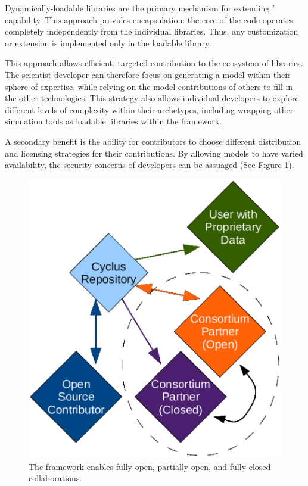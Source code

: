 Dynamically-loadable libraries are the primary mechanism for extending \Cyclus' capability. 
This approach provides encapsulation: the core of the code operates
completely independently from the individual libraries. Thus, any
customization or extension is implemented only in the loadable
library. 

This approach allows efficient, targeted contribution to the ecosystem of libraries.  The 
scientist-developer can therefore focus on generating a model within their 
sphere of expertise, while relying on the model contributions of others to fill 
in the other technologies.  This strategy also allows individual developers to
explore different levels of complexity within their archetypes, including
wrapping other simulation tools as loadable libraries within the \Cyclus
framework.

A secondary benefit is the ability for
contributors to choose different distribution and licensing strategies
for their contributions. By allowing models to have varied
availability, the security concerns of developers can be
assuaged (See Figure \ref{fig:modifiedopen}).

\begin{figure}[htbp!]
\begin{center}
\includegraphics{./images/modifiedopen.eps}
\end{center}
\caption{The \Cyclus framework enables fully open, partially open, and fully
closed collaborations\cite{wilson_cyclus:_2012}.}
\label{fig:modifiedopen}
\end{figure}

